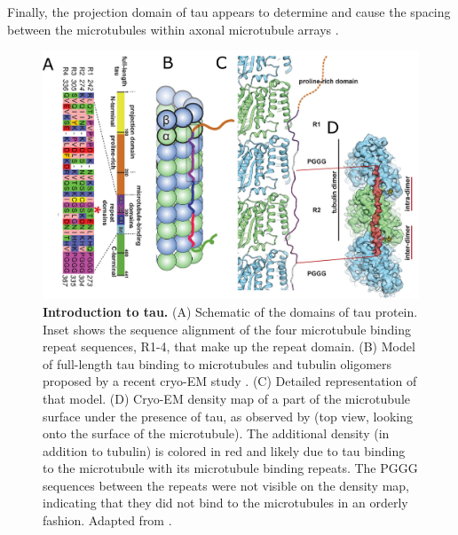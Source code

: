 Finally, the projection domain of tau appears to determine and cause the spacing between the microtubules within axonal microtubule arrays \parencite{Chen1992}.
\begin{figure}[h!tb]
\centering
\includegraphics[width=\linewidth]{Figures/tau.png}
\caption[Introduction to tau.]{\textbf{Introduction to tau.}
(A) Schematic of the domains of tau protein. Inset shows the sequence alignment of the four microtubule binding repeat sequences, R1-4, that make up the repeat domain. (B) Model of full-length tau binding to microtubules and tubulin oligomers proposed by a recent cryo-EM study \parencite{Kellogg2018}. (C) Detailed representation of that model. (D) Cryo-EM density map of a part of the microtubule surface under the presence of tau, as observed by \cite{Kellogg2018} (top view, looking onto the surface of the microtubule). The additional density (in addition to tubulin) is colored in red and likely due to tau binding to the microtubule with its microtubule binding repeats. The PGGG sequences between the repeats were not visible on the density map, indicating that they did not bind to the microtubules in an orderly fashion. Adapted from \cite{Kellogg2018}. 
	}\label{tau}
\end{figure}

